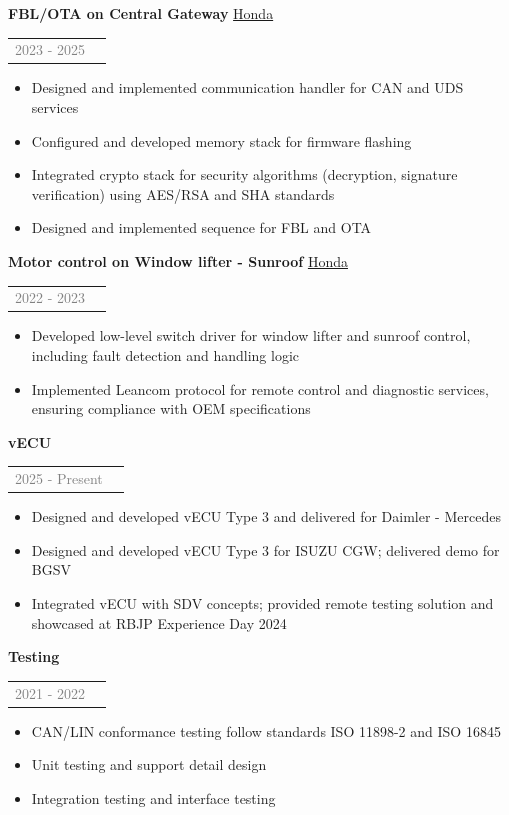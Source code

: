 \documentclass[11pt]{article}
\begin{document}
\textbf{FBL/OTA on Central Gateway} \underline{Honda}
\begin{tabular}{ll}
\textcolor{gray}{2023 - 2025} 
\end{tabular}
\begin{itemize}
    \item Designed and implemented communication handler for CAN and UDS services 
    \item Configured and developed memory stack for firmware flashing
    \item Integrated crypto stack for security algorithms (decryption, signature verification) using AES/RSA and SHA standards
    \item Designed and implemented sequence for FBL and OTA
\end{itemize}

\textbf{Motor control on Window lifter - Sunroof} \underline{Honda}
\begin{tabular}{ll}
\textcolor{gray}{2022 - 2023} 
\end{tabular}
\begin{itemize}
    \item Developed low-level switch driver for window lifter and sunroof control, including fault detection and handling logic 
    \item Implemented Leancom protocol for remote control and diagnostic services, ensuring compliance with OEM specifications
\end{itemize}

\textbf{vECU}
\begin{tabular}{ll}
\textcolor{gray}{2025 - Present} 
\end{tabular}
\begin{itemize}
    \item Designed and developed vECU Type 3 and delivered for Daimler - Mercedes
    \item Designed and developed vECU Type 3 for ISUZU CGW; delivered demo for BGSV
    \item Integrated vECU with SDV concepts; provided remote testing solution and showcased at RBJP Experience Day 2024
\end{itemize}

\textbf{Testing}
\begin{tabular}{ll}
\textcolor{gray}{2021 - 2022} 
\end{tabular}
\begin{itemize}
    \item CAN/LIN conformance testing follow standards ISO 11898-2 and ISO 16845 
    \item Unit testing and support detail design 
    \item Integration testing and interface testing
\end{itemize}
\end{document}
